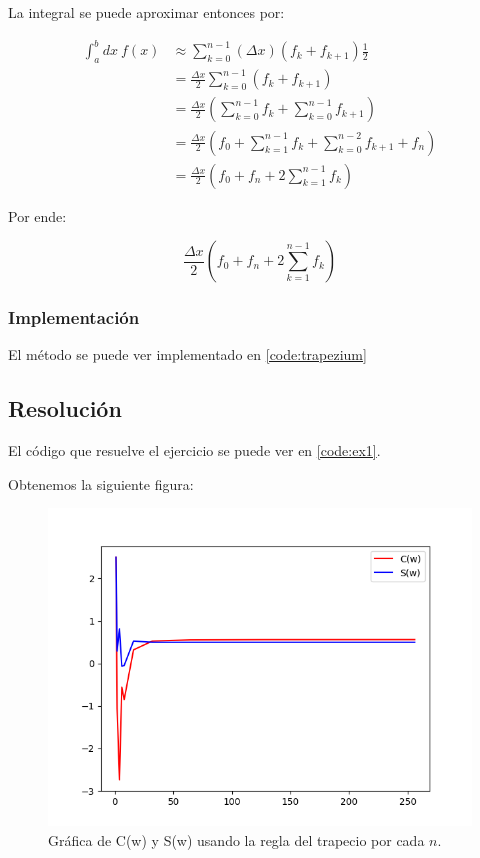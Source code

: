 \newpage 

La integral se puede aproximar entonces por:

\begin{align*}
	\int_{a}^{b} dx ~ f(x)
	&\approx \sum_{k = 0}^{n - 1} (\Delta x)( f_k + f_{k+1} )\frac{1}{2} \\
	&= \frac{\Delta x}{2} \sum_{k = 0}^{n - 1} ( f_k + f_{k+1}) \\
	&= \frac{\Delta x}{2} (\sum_{k = 0}^{n - 1}  f_k + \sum_{k = 0}^{n - 1} f_{k+1}) \\
	&= 
	\frac{\Delta x}{2}
	(
	f_0 + \sum_{k = 1}^{n - 1}  f_k 
	+ \sum_{k = 0}^{n - 2} f_{k+1}
	+ f_n
	) \\
	&= \frac{\Delta x}{2}(f_0 + f_n  + 2 \sum_{k = 1}^{n - 1}  f_k )
\end{align*}


Por ende: 

\begin{equation}
\boxed{\frac{\Delta x}{2}(f_0 + f_n  + 2 \sum_{k = 1}^{n - 1}  f_k )}
\end{equation}



\subsubsection{Implementación}

El método se puede ver implementado en \ref{code:trapezium}


\newpage 

\subsection{Resolución}

El código que resuelve el ejercicio se puede ver en \ref{code:ex1}. 

Obtenemos la siguiente figura:

\begin{figure}[H]
	\includegraphics[width=\linewidth]{figures/ex1.png}
	\caption{Gráfica de C(w) y S(w) usando la regla del trapecio por cada $n$.}
	\label{fig:c_s_subdiv}
\end{figure}


